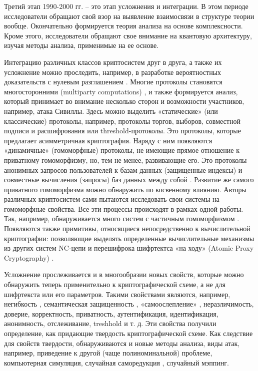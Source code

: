      \normalcolor Третий этап 1990-2000 гг. – это этап усложнения и интеграции. В этом периоде исследователи обращают свой взор на выявление взаимосвязи в структуре теории вообще. Окончательно формируется теория анализа на основе комплексности. Кроме этого, исследователи обращают свое внимание на квантовую архитектуру, изучая методы анализа, применимые на ее основе. \cite{Foundatios-95}\par
     Интеграцию различных классов криптосистем друг в друга, а также их усложнение можно проследить, например, в разработке вероятностных доказательств с нулевым разглашением \cite{CSProofs-94}. Многие протоколы становятся многосторонними (multiparty computations) \cite{MultipartyGoldwasser-97}, и также формируется анализ, который принимает во внимание несколько сторон и возможности участников, например, атака Сивиллы. Здесь можно выделить «статические» (или классические) протоколы, например, протоколы торгов, выборов, совместной подписи и расшифрования или threshold-протоколы. Это протоколы, которые предлагает асимметричная криптография. Наряду с ним появляются «динамичные» (гомоморфные) протоколы, не имеющие прямое отношение к приватному гомоморфизму, но, тем не менее, развивающие его. Это протоколы анонимных запросов пользователей к базам данных (защищенные индексы) и совместные вычисления (запросы) баз данных между собой \cite{PrivateRetrival-97}. Развитие же самого приватного гомоморфизма можно обнаружить по косвенному влиянию. Авторы различных криптосистем сами пытаются исследовать свои системы на гомоморфные свойства. Все эти процессы происходят в рамках одной работы. Так, например, обнаруживается много систем с частичным гомоморфизмом \cite{OkamotoUchiyama-98} \cite{Paillier-99}. Появляются также примитивы, относящиеся непосредственно к вычислительной криптографии: позволяющие выделять определенные вычислительные механизмы из других систем NC-цепи \cite{NCComputing-99} и перешифрока шифртектса «на ходу» (Atomic Proxy Cryptography) \cite{AtomicProxy-98}.\par
     Усложнение прослеживается и в многообразии новых свойств, которые можно обнаружить теперь применительно к криптографической схеме, а не для шифртекста или его параметров. Такими свойствами являются, например, негибкость \cite{NonMalleable-99} \cite{MalleableCrypto-91}, семантическая защищенность \cite{ChoosenAnyOneWay-00}, «самоослепление» \cite{Paillier-99}, неразличимость, доверие, корректность, приватность, аутентификация, идентификация, анонимность, отслеживание, treshhold и т. д. Эти свойства получили определение, как придающие твердость \cite{Robustness, wiki} криптографической схеме. Как следствие для свойств твердости, обнаруживаются и новые  методы анализа, виды атак, например, приведение к другой (чаще полиноминальной) проблеме, компьютерная симуляция, случайная саморедукция \cite{SelfReduce-93}, случайный мэппинг. \cite[с.317/2]{NewDirsLater-97}\par
